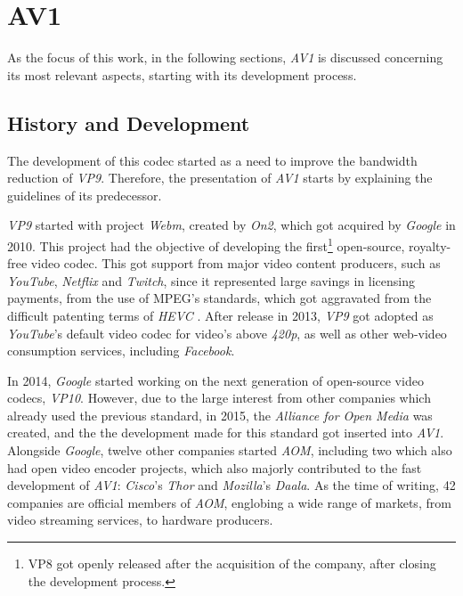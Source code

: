 \nocite{agostiniDesenvolvimentoArquiteturasAlto2007}

\section{AV1}

As the focus of this work, in the following sections, \emph{AV1} is discussed concerning its most relevant aspects, starting with its development process.

\subsection{History and Development}

\nocite{debarghamukherjeeAllThingsRTC2019Opening2019}

The development of this codec started as a need to improve the bandwidth reduction of \emph{VP9}. Therefore, the presentation of \emph{AV1} starts by explaining the guidelines of its predecessor.

\emph{VP9} started with project \emph{Webm}, created by \emph{On2}, which got acquired by \emph{Google} in 2010. This project had the objective of developing the first\footnote{VP8 got openly released after the acquisition of the company, after closing the development process.} open-source, royalty-free video codec. This got support from major video content producers, such as \emph{YouTube}, \emph{Netflix} and \emph{Twitch}, since it represented large savings in licensing payments, from the use of MPEG's standards, which got aggravated from the difficult patenting terms of \emph{HEVC} \cite{streamingmediaHEVCAdvancePatent2015}. After release in 2013, \emph{VP9} got adopted as \emph{YouTube}'s default video codec for video's above \emph{420p}, as well as other web-video consumption services, including \emph{Facebook}.

In 2014, \emph{Google} started working on the next generation of open-source video codecs, \emph{VP10}. However, due to the large interest from other companies which already used the previous standard, in 2015, the \emph{Alliance for Open Media} was created, and the the development made for this standard got inserted into \emph{AV1}. Alongside \emph{Google}, twelve other companies started \emph{AOM}, including two which also had open video encoder projects, which also majorly contributed to the fast development of \emph{AV1}: \emph{Cisco}'s \emph{Thor} and \emph{Mozilla}'s \emph{Daala}. As the time of writing, 42 companies are official members of \emph{AOM}, englobing a wide range of markets, from video streaming services, to hardware producers.

